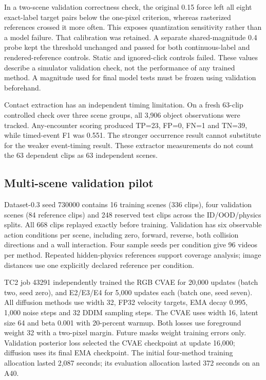 \documentclass[11pt,a4paper]{article}
\begin{document}
In a two-scene validation correctness check, the original 0.15 force left all eight exact-label target pairs below the one-pixel criterion, whereas rasterized references crossed it more often. This exposes quantization sensitivity rather than a model failure. That calibration was retained. A separate shared-magnitude 0.4 probe kept the threshold unchanged and passed for both continuous-label and rendered-reference controls. Static and ignored-click controls failed. These values describe a simulator validation check, not the performance of any trained method. A magnitude used for final model tests must be frozen using validation beforehand.

Contact extraction has an independent timing limitation. On a fresh 63-clip controlled check over three scene groups, all 3,906 object observations were tracked. Any-encounter scoring produced TP=23, FP=0, FN=1 and TN=39, while timed-event F1 was 0.551. The stronger occurrence result cannot substitute for the weaker event-timing result. These extractor measurements do not count the 63 dependent clips as 63 independent scenes.

\subsection{Multi-scene validation pilot}
Dataset-0.3 seed 730000 contains 16 training scenes (336 clips), four validation scenes (84 reference clips) and 248 reserved test clips across the ID/OOD/physics splits. All 668 clips replayed exactly before training. Validation has six observable action conditions per scene, including zero, forward, reverse, both collision directions and a wall interaction. Four sample seeds per condition give 96 videos per method. Repeated hidden-physics references support coverage analysis; image distances use one explicitly declared reference per condition.

TC2 job 43291 independently trained the RGB CVAE for 20,000 updates (batch two, seed zero), and E2/E3/E4 for 5,000 updates each (batch one, seed seven). All diffusion methods use width 32, FP32 velocity targets, EMA decay 0.995, 1,000 noise steps and 32 DDIM sampling steps. The CVAE uses width 16, latent size 64 and beta 0.001 with 20-percent warmup. Both losses use foreground weight 32 with a two-pixel margin. Future masks weight training errors only. Validation posterior loss selected the CVAE checkpoint at update 16,000; diffusion uses its final EMA checkpoint. The initial four-method training allocation lasted 2,087 seconds; its evaluation allocation lasted 372 seconds on an A40.
\end{document}
